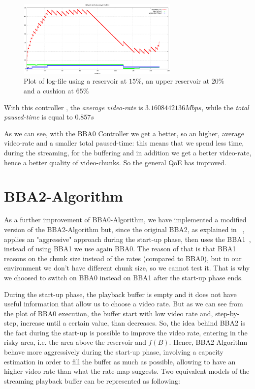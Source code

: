 \documentclass[a4paper]{report}
\begin{document}
\begin{figure}[H]
  \begin{center}
    \includegraphics[width=0.7\textwidth]{res_fifteen_cushion_sixtyfive}
  \end{center}
  \caption{Plot of log-file using a reservoir at $15\%$, an upper reservoir at $20\%$ and a cushion at $65\%$}\label{resfifteen}
\end{figure}

With this controller , the \textit{average video-rate} is $3.1608442136 Mbps$, while the \textit{total paused-time} is equal to $0.857 s$

As we can see, with the BBA0 Controller we get a better, so an higher, average video-rate  and a smaller total paused-time: this means that we spend less time, during the streaming, for the buffering and in addition we get a better video-rate, hence a better quality of video-chunks. So the general QoE has improved.

\section{BBA2-Algorithm}
As a further improvement of BBA0-Algorithm, we have implemented a modified version of the BBA2-Algorithm but, since the original BBA2, as explained in ~\cite{Huang:2014:BAR:2740070.2626296}, applies an "aggressive" approach during the start-up phase, then uses the BBA1~\cite{Huang:2014:BAR:2740070.2626296}, instead of using BBA1  we use again BBA0. The reason of that is that BBA1 reasons on the chunk size instead of the rates (compared to BBA0), but in our environment we don't have different chunk size, so we cannot test it. That is why we choosed to switch on BBA0 instead on BBA1 after the start-up phase ends.

During the start-up phase, the playback buffer is empty and it does not have useful information that allow us to choose a video rate. But as we can see from the plot of BBA0 execution, the buffer start with low video rate and, step-by-step, increase until a certain value, than decreases. So, the idea behind BBA2 is the fact during the start-up is possible to improve the video rate, entering in the risky area, i.e. the area above the reservoir and $f(B)$. Hence, BBA2 Algorithm behave more aggressively during the start-up phase, involving a capacity estimation in order to fill the buffer as much as possible, allowing to have an higher video rate than what the rate-map suggests.
Two equivalent models of the streaming playback buffer can be represented as following:
\end{document}
